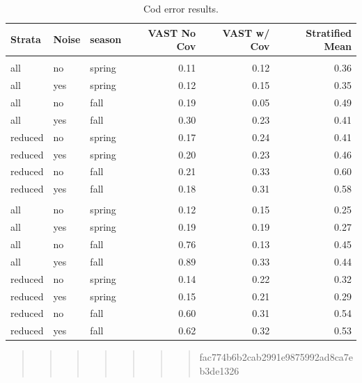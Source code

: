 \documentclass[
  12pt,
]{article}
\begin{document}
\begin{table}

\caption{\label{tab:CodERROR}Cod error results.}
\centering
\fontsize{10}{12}\selectfont
\begin{tabular}[t]{lllrrr}
\toprule
Strata & Noise & season & VAST No Cov & VAST w/ Cov & Stratified Mean\\
\midrule
\addlinespace[0.3em]
\multicolumn{1}{l}{\textbf{constant}}\\
\hspace{1em}all & no & spring & 0.11 & 0.12 & 0.36\\
\hspace{1em}all & yes & spring & 0.12 & 0.15 & 0.35\\
\hspace{1em}all & no & fall & 0.19 & 0.05 & 0.49\\
\hspace{1em}all & yes & fall & 0.30 & 0.23 & 0.41\\
\hspace{1em}reduced & no & spring & 0.17 & 0.24 & 0.41\\
\hspace{1em}reduced & yes & spring & 0.20 & 0.23 & 0.46\\
\hspace{1em}reduced & no & fall & 0.21 & 0.33 & 0.60\\
\hspace{1em}reduced & yes & fall & 0.18 & 0.31 & 0.58\\
\addlinespace[0.3em]
\multicolumn{1}{l}{\textbf{increasing}}\\
\hspace{1em}all & no & spring & 0.12 & 0.15 & 0.25\\
\hspace{1em}all & yes & spring & 0.19 & 0.19 & 0.27\\
\hspace{1em}all & no & fall & 0.76 & 0.13 & 0.45\\
\hspace{1em}all & yes & fall & 0.89 & 0.33 & 0.44\\
\hspace{1em}reduced & no & spring & 0.14 & 0.22 & 0.32\\
\hspace{1em}reduced & yes & spring & 0.15 & 0.21 & 0.29\\
\hspace{1em}reduced & no & fall & 0.60 & 0.31 & 0.54\\
\hspace{1em}reduced & yes & fall & 0.62 & 0.32 & 0.53\\
\bottomrule
\end{tabular}
\end{table}

\begin{quote}
\begin{quote}
\begin{quote}
\begin{quote}
\begin{quote}
\begin{quote}
\begin{quote}
fac774b6b2cab2991e9875992ad8ca7eb3de1326
\end{quote}
\end{quote}
\end{quote}
\end{quote}
\end{quote}
\end{quote}
\end{quote}
\end{document}
